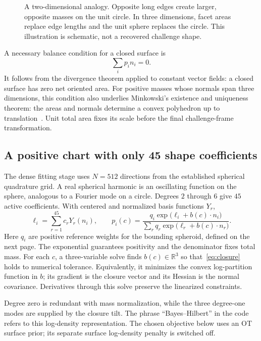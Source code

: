 \documentclass[11pt,a4paper]{article}
\newcommand{\R}{\mathbb{R}}
\begin{document}
\begin{figure}[h]
\centering\resizebox{\linewidth}{!}{}
\caption{A two-dimensional analogy. Opposite long edges create larger, opposite masses on the unit circle. In three dimensions, facet areas replace edge lengths and the unit sphere replaces the circle. This illustration is schematic, not a recovered challenge shape.}
\end{figure}

A necessary balance condition for a closed surface is
\begin{equation}
 \sum_i p_i n_i=0.\label{eq:closure}
\end{equation}
It follows from the divergence theorem applied to constant vector fields: a closed surface has zero net oriented area. For positive masses whose normals span three dimensions, this condition also underlies Minkowski's existence and uniqueness theorem: the areas and normals determine a convex polyhedron up to translation~\cite{sellaroli2017}. Unit total area fixes its scale before the final challenge-frame transformation.

\subsection*{A positive chart with only 45 shape coefficients}
The dense fitting stage uses $N=512$ directions from the established spherical quadrature grid. A real spherical harmonic is an oscillating function on the sphere, analogous to a Fourier mode on a circle. Degrees $2$ through $6$ give $45$ active coefficients. With centered and normalized basis functions $Y_r$,
\begin{equation}
 \ell_i=\sum_{r=1}^{45}c_r Y_r(n_i),\qquad
 p_i(c)=\frac{q_i\exp\bigl(\ell_i+b(c)\cdot n_i\bigr)}
 {\sum_r q_r\exp\bigl(\ell_r+b(c)\cdot n_r\bigr)}.
 \label{eq:chart}
\end{equation}
Here $q_i$ are positive reference weights for the bounding spheroid, defined on the next page. The exponential guarantees positivity and the denominator fixes total mass. For each $c$, a three-variable solve finds $b(c)\in\R^3$ so that~\eqref{eq:closure} holds to numerical tolerance. Equivalently, it minimizes the convex log-partition function in $b$; its gradient is the closure vector and its Hessian is the normal covariance. Derivatives through this solve preserve the linearized constraints.

Degree zero is redundant with mass normalization, while the three degree-one modes are supplied by the closure tilt. The phrase ``Bayes--Hilbert'' in the code refers to this log-density representation. The chosen objective below uses an OT surface prior; its separate surface log-density penalty is switched off.
\end{document}
